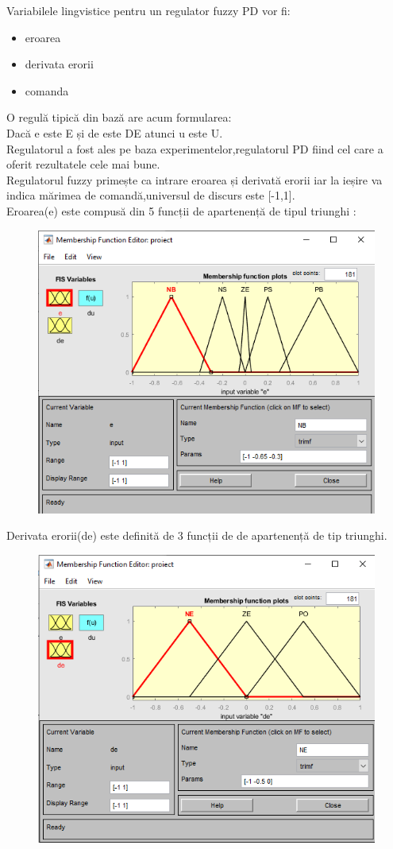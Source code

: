 \documentclass[11pt]{article}
\begin{document}
Variabilele lingvistice pentru un regulator fuzzy PD vor fi:
\begin{itemize}
	\item eroarea
	\item derivata erorii
	\item comanda
\end{itemize}
O regulă tipică din bază are acum formularea:\\
Dacă e este E și de este DE atunci u este U.\\
Regulatorul a fost ales pe baza experimentelor,regulatorul PD fiind cel care a oferit rezultatele cele mai bune.\\
Regulatorul fuzzy primește ca intrare eroarea și derivată erorii iar la ieșire va indica mărimea de comandă,universul de discurs este [-1,1].\\
Eroarea(e) este compusă din 5 funcții de apartenență de tipul triunghi :
\begin{figure}[H]
	\centering
	\includegraphics[width=0.5\linewidth]{var_e.PNG}
	\label{fig:test2}
\end{figure}
Derivata erorii(de) este definită de 3 funcții de de apartenență de tip triunghi.
\begin{figure}[H]
	\centering
	\includegraphics[width=0.5\linewidth]{var_de.PNG}
	\label{fig:test2}
\end{figure}
\end{document}
